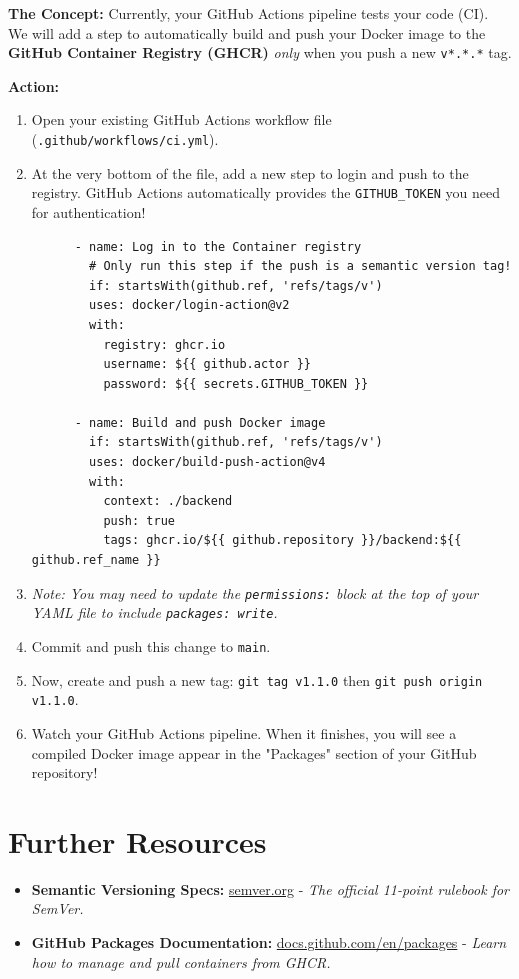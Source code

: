 \documentclass[a4paper,12pt]{article}
\begin{document}
\textbf{The Concept:} Currently, your GitHub Actions pipeline tests your code (CI). We will add a step to automatically build and push your Docker image to the \textbf{GitHub Container Registry (GHCR)} \textit{only} when you push a new \texttt{v*.*.*} tag.

\vspace{0.3cm}
\textbf{Action:}
\begin{enumerate}
    \item Open your existing GitHub Actions workflow file (\texttt{.github/workflows/ci.yml}).
    \item At the very bottom of the file, add a new step to login and push to the registry. GitHub Actions automatically provides the \texttt{GITHUB\_TOKEN} you need for authentication!
    \begin{verbatim}
      - name: Log in to the Container registry
        # Only run this step if the push is a semantic version tag!
        if: startsWith(github.ref, 'refs/tags/v')
        uses: docker/login-action@v2
        with:
          registry: ghcr.io
          username: ${{ github.actor }}
          password: ${{ secrets.GITHUB_TOKEN }}

      - name: Build and push Docker image
        if: startsWith(github.ref, 'refs/tags/v')
        uses: docker/build-push-action@v4
        with:
          context: ./backend
          push: true
          tags: ghcr.io/${{ github.repository }}/backend:${{ github.ref_name }}
    \end{verbatim}
    \item \textit{Note: You may need to update the \texttt{permissions:} block at the top of your YAML file to include \texttt{packages: write}.}
    \item Commit and push this change to \texttt{main}. 
    \item Now, create and push a new tag: \texttt{git tag v1.1.0} then \texttt{git push origin v1.1.0}.
    \item Watch your GitHub Actions pipeline. When it finishes, you will see a compiled Docker image appear in the "Packages" section of your GitHub repository!
\end{enumerate}


\section*{Further Resources}

\begin{itemize}
    \item \textbf{Semantic Versioning Specs:} \href{https://semver.org/}{semver.org} - \textit{The official 11-point rulebook for SemVer.}
    \item \textbf{GitHub Packages Documentation:} \href{https://docs.github.com/en/packages}{docs.github.com/en/packages} - \textit{Learn how to manage and pull containers from GHCR.}
\end{itemize}
\end{document}
